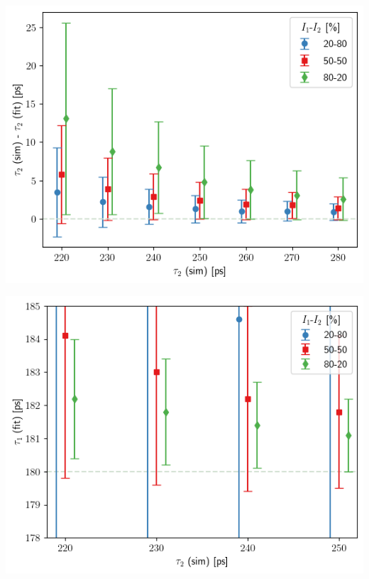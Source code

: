 \vspace{0.5cm}
\begin{minipage}{.45\linewidth}
    \centering
    \includegraphics[width=\linewidth]{Batch 1+2/Batch1+2/output/plotfin/t2.png}
    \label{fig:180-tau2}
\end{minipage}
\hfill
\begin{minipage}{.45\linewidth}
    \centering
    \includegraphics[width=\linewidth]{Batch 1+2/Batch1+2/output/plotfin/t1zoom.png}
    \label{fig:180-tau1zoom}
\end{minipage}
\vspace{0.5cm}

